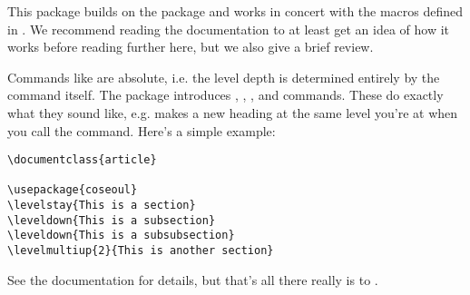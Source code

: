 This package builds on the  package and works in concert with the macros defined in .
We recommend reading the  documentation to at least get an idea of how it works before reading further here, but we also give a brief review.

Commands like  are absolute, i.e. the level depth is determined entirely by the command itself.
The  package introduces , , , and  commands.
These do exactly what they sound like, e.g.  makes a new heading at the same level you're at when you call the command.
Here's a simple example:
\begin{lstlisting}
\documentclass{article}

\usepackage{coseoul}
\levelstay{This is a section}
\leveldown{This is a subsection}
\leveldown{This is a subsubsection}
\levelmultiup{2}{This is another section}

\end{lstlisting}
See the  documentation for details, but that's all there really is to .

